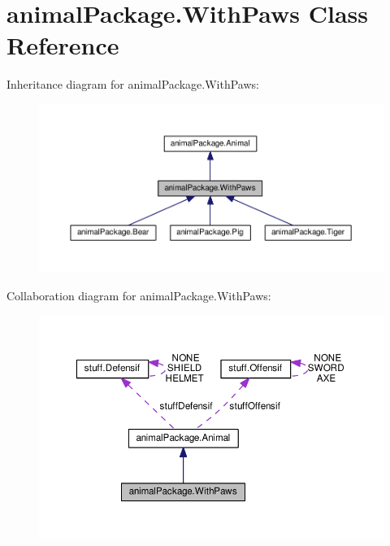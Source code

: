 \hypertarget{classanimal_package_1_1_with_paws}{}\section{animal\+Package.\+With\+Paws Class Reference}
\label{classanimal_package_1_1_with_paws}


Inheritance diagram for animal\+Package.\+With\+Paws\+:\nopagebreak
\begin{figure}[H]
\begin{center}
\leavevmode
\includegraphics[width=350pt]{classanimal_package_1_1_with_paws__inherit__graph}
\end{center}
\end{figure}


Collaboration diagram for animal\+Package.\+With\+Paws\+:\nopagebreak
\begin{figure}[H]
\begin{center}
\leavevmode
\includegraphics[width=350pt]{classanimal_package_1_1_with_paws__coll__graph}
\end{center}
\end{figure}
